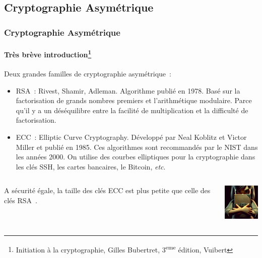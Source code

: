 \documentclass{beamer}
\begin{document}
    \subsection{Cryptographie Asymétrique}\label{subsec:cryptographie-asymetrique}
    \begin{frame}
        \frametitle{Cryptographie Asymétrique}
        \framesubtitle{Très brève introduction\footnote{Initiation à la cryptographie, Gilles Bubertret, 3\textsuperscript{eme} édition, Vuibert}}
        \transdissolve
        Deux grandes familles de cryptographie asymétrique~:
        \begin{itemize}
            \item RSA~: Rivest, Shamir, Adleman.
            Algorithme publié en 1978.
            Basé sur la factorisation de grands nombres premiers et l'arithmétique modulaire.
            Parce qu'il y a un déséquilibre entre la facilité de multiplication et la difficulté de factorisation.
            \item ECC~: Elliptic Curve Cryptography.
            Développé par Neal Koblitz et Victor Miller et publié en 1985.
            Ces algorithmes sont recommandés par le NIST dans les années 2000.
            On utilise des courbes elliptiques pour la cryptographie dans les clés SSH, les cartes bancaires, le Bitcoin, \textit{etc}.
        \end{itemize}
        \begin{columns}
            \begin{column}{0.8\textwidth}
                A sécurité égale, la taille des clés ECC est plus petite que celle des clés RSA~.
            \end{column}
            \begin{column}{0.2\textwidth}
                \centering
                \includegraphics[width=2cm]{image/girl-hiding-a-secret}
            \end{column}
        \end{columns}
    \end{frame}
\end{document}
